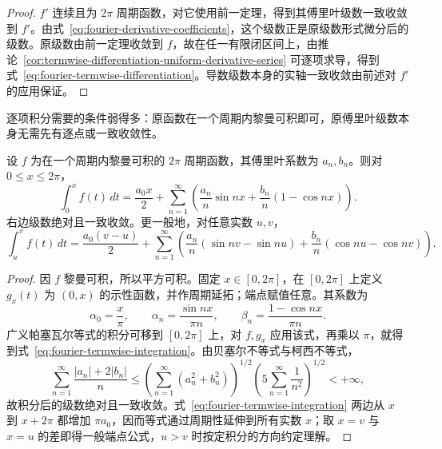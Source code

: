 \begin{proof}
$f'$ 连续且为 $2\pi$ 周期函数，对它使用前一定理，得到其傅里叶级数一致收敛到 $f'$。由式~\eqref{eq:fourier-derivative-coefficients}，这个级数正是原级数形式微分后的级数。原级数由前一定理收敛到 $f$，故在任一有限闭区间上，由推论~\ref{cor:termwise-differentiation-uniform-derivative-series} 可逐项求导，得到式~\eqref{eq:fourier-termwise-differentiation}。导数级数本身的实轴一致收敛由前述对 $f'$ 的应用保证。
\end{proof}

逐项积分需要的条件弱得多：原函数在一个周期内黎曼可积即可，原傅里叶级数本身无需先有逐点或一致收敛性。

\begin{theorem}[傅里叶级数的逐项积分]
\label{thm:fourier-termwise-integration}
设 $f$ 为在一个周期内黎曼可积的 $2\pi$ 周期函数，其傅里叶系数为 $a_n,b_n$。则对 $0\leq x\leq2\pi$，
\begin{equation}
    \int_0^xf(t)\,dt=\frac{a_0x}{2}
       +\sum_{n=1}^\infty
          \left(\frac{a_n}{n}\sin nx
                  +\frac{b_n}{n}(1-\cos nx)\right).
    \label{eq:fourier-termwise-integration}
\end{equation}
右边级数绝对且一致收敛。更一般地，对任意实数 $u,v$，
\begin{equation}
    \int_u^vf(t)\,dt=\frac{a_0(v-u)}2
       +\sum_{n=1}^\infty\left(
          \frac{a_n}{n}(\sin nv-\sin nu)
           +\frac{b_n}{n}(\cos nu-\cos nv)\right).
    \label{eq:fourier-integral-arbitrary-endpoints}
\end{equation}
\end{theorem}

\begin{proof}
因 $f$ 黎曼可积，所以平方可积。固定 $x\in[0,2\pi]$，在 $[0,2\pi]$ 上定义 $g_x(t)$ 为 $(0,x)$ 的示性函数，并作周期延拓；端点赋值任意。其系数为
\[
    \alpha_0=\frac x\pi,\qquad
    \alpha_n=\frac{\sin nx}{\pi n},\qquad
    \beta_n=\frac{1-\cos nx}{\pi n}.
\]
广义帕塞瓦尔等式的积分可移到 $[0,2\pi]$ 上，对 $f,g_x$ 应用该式，再乘以 $\pi$，就得到式~\eqref{eq:fourier-termwise-integration}。由贝塞尔不等式与柯西不等式，
\[
    \sum_{n=1}^\infty\frac{|a_n|+2|b_n|}{n}
       \leq\left(\sum_{n=1}^\infty(a_n^2+b_n^2)\right)^{1/2}
           \left(5\sum_{n=1}^\infty\frac1{n^2}\right)^{1/2}<+\infty,
\]
故积分后的级数绝对且一致收敛。式~\eqref{eq:fourier-termwise-integration} 两边从 $x$ 到 $x+2\pi$ 都增加 $\pi a_0$，因而等式通过周期性延伸到所有实数 $x$；取 $x=v$ 与 $x=u$ 的差即得一般端点公式，$u>v$ 时按定积分的方向约定理解。
\end{proof}

